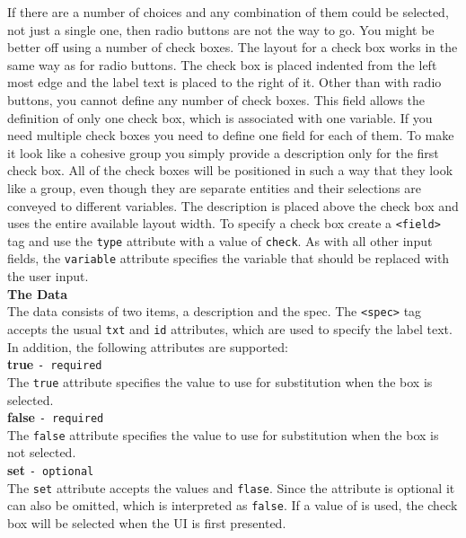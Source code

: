 If there are a number of choices and any combination of them could be
selected, not just a single one, then radio buttons are not the way to
go. You might be better off using a number of check boxes. The layout
for a check box works in the same way as for radio buttons. The check
box is placed indented from the left most edge and the label text is
placed to the right of it. Other than with radio buttons, you cannot
define any number of check boxes. This field allows the definition of
only one check box, which is associated with one variable. If you need
multiple check boxes you need to define one field for each of them.  To
make it look like a cohesive group you simply provide a description only
for the first check box. All of the check boxes will be positioned in
such a way that they look like a group, even though they are separate
entities and their selections are conveyed to different variables. The
description  is placed above the check box and uses the entire available
layout width. To specify a check box create a \texttt{<field>} tag and
use the \texttt{type} attribute with a value of \texttt{check}. As with
all other input fields, the \texttt{variable} attribute specifies the
variable that should be replaced with the user input.\\

\textbf{The Data}\\

The data consists of two items, a description and the spec. The
\texttt{<spec>} tag accepts the usual \texttt{txt} and \texttt{id}
attributes, which are used to specify the label text. In addition, the
following attributes are supported:\\

\textbf{true} \texttt{- required}\\

The \texttt{true} attribute specifies the value to use for substitution
when the box is selected.\\

\textbf{false} \texttt{- required}\\

The \texttt{false} attribute specifies the value to use for substitution
when the box is not selected.\\

\textbf{set} \texttt{- optional}\\

The \texttt{set} attribute accepts the values  and
\texttt{flase}. Since the attribute is optional it can also be omitted,
which is interpreted as \texttt{false}. If a value of  is
used, the check box will be selected when the UI is first presented.\\

